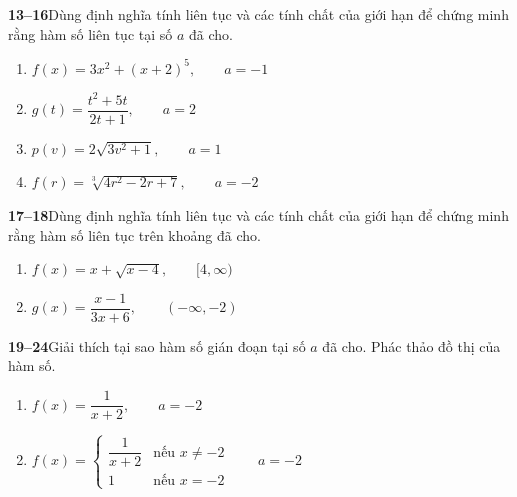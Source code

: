\begin{minipage}[t]{0.485\textwidth}
\vspace{3pt}
\noindent{\color{stewartcyan}\rule{\linewidth}{0.5pt}}
\vspace{3pt}

\noindent
\textbf{\textsf{\color{stewartcyan}13--16}}\enskip Dùng định nghĩa tính liên tục và các tính chất của giới hạn để chứng minh rằng hàm số liên tục tại số $a$ đã cho.
\vspace{3pt}

\begin{enumerate}[label=\textbf{\arabic*.}, leftmargin=15pt, itemsep=5pt, topsep=0pt, start=13]
\item $f(x) = 3x^2 + (x + 2)^5, \qquad a = -1$
\item $g(t) = \dfrac{t^2 + 5t}{2t + 1}, \qquad a = 2$
\item $p(v) = 2\sqrt{3v^2 + 1}, \qquad a = 1$
\item $f(r) = \sqrt[3]{4r^2 - 2r + 7}, \qquad a = -2$
\end{enumerate}

\vspace{3pt}
\noindent{\color{stewartcyan}\rule{\linewidth}{0.5pt}}
\vspace{3pt}

\noindent
\textbf{\textsf{\color{stewartcyan}17--18}}\enskip Dùng định nghĩa tính liên tục và các tính chất của giới hạn để chứng minh rằng hàm số liên tục trên khoảng đã cho.
\vspace{3pt}

\begin{enumerate}[label=\textbf{\arabic*.}, leftmargin=15pt, itemsep=5pt, topsep=0pt, start=17]
\item $f(x) = x + \sqrt{x - 4}, \qquad [4, \infty)$
\item $g(x) = \dfrac{x - 1}{3x + 6}, \qquad (-\infty, -2)$
\end{enumerate}

\vspace{3pt}
\noindent{\color{stewartcyan}\rule{\linewidth}{0.5pt}}
\vspace{3pt}

\noindent
\textbf{\textsf{\color{stewartcyan}19--24}}\enskip Giải thích tại sao hàm số gián đoạn tại số $a$ đã cho. Phác thảo đồ thị của hàm số.
\vspace{3pt}

\begin{enumerate}[label=\textbf{\arabic*.}, leftmargin=15pt, itemsep=6pt, topsep=0pt, start=19]
\item $f(x) = \dfrac{1}{x + 2}, \qquad a = -2$
\item $f(x) = \begin{cases} \dfrac{1}{x + 2} & \text{nếu } x \ne -2 \\[6pt] 1 & \text{nếu } x = -2 \end{cases} \qquad a = -2$
\end{enumerate}
\end{minipage}
